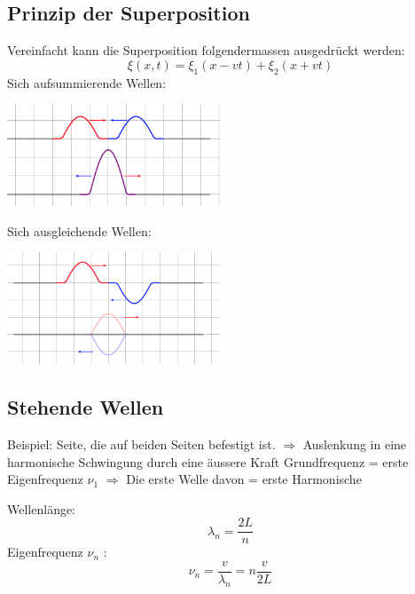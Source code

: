 \documentclass[7pt]{article}
\begin{document}
\begin{multicols*}{3}
\subsection{Prinzip der Superposition}
Vereinfacht kann die Superposition folgendermassen ausgedr{\"u}ckt werden:
\begin{equation*}
\xi(x,t) = \xi _1(x-vt) + \xi _2(x+vt)
\end{equation*}
\newline
Sich aufsummierende Wellen:
\begin{center}
	\includegraphics[width=180pt]{images/superposition2.png}
\end{center}
\columnbreak

Sich ausgleichende Wellen:
\begin{center}
	\includegraphics[width=180pt]{images/superposition1.png}
\end{center}

\subsection{Stehende Wellen}
Beispiel: Seite, die auf beiden Seiten befestigt ist. \newline
$\Longrightarrow$ Auslenkung in eine harmonische Schwingung durch eine {\"a}ussere Kraft\newline
\newline
Grundfrequenz = erste Eigenfrequenz $\nu_1$ $\Longrightarrow$ Die erste Welle davon = erste Harmonische \newline

Wellenl{\"a}nge:
\begin{equation*}
\lambda _n = \frac{2L}{n}
\end{equation*}
\newline
Eigenfrequenz $\nu_n$ :
\begin{equation*}
\nu _n = \frac{v}{\lambda _n} = n \frac{v}{2L}
\end{equation*}


\end{multicols*}
\end{document}
